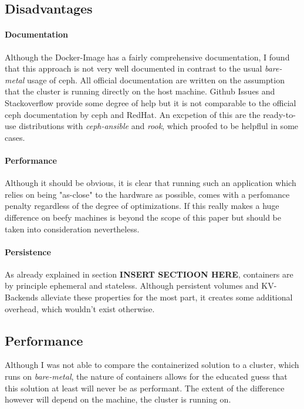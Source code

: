 \documentclass[titlepage, a4paper, 11pt]{scrartcl}
\begin{document}
        \subsection{Disadvantages}

            \paragraph{Documentation} Although the Docker-Image has a fairly comprehensive documentation, I found that this approach is not very well documented in contrast to the usual \textit{bare-metal} usage of ceph. All official documentation are written on the assumption that the cluster is running directly on the host machine. Github Issues and Stackoverflow provide some degree of help but it is not comparable to the official ceph documentation by ceph and RedHat. An excpetion of this are the ready-to-use distributions with \textit{ceph-ansible} and \textit{rook}, which proofed to be helpflul in some cases.

            \paragraph{Performance} Although it should be obvious, it is clear that running such an application which relies on being "as-close" to the hardware as possible, comes with a perfomance penalty regardless of the degree of optimizations. If this really makes a huge difference on beefy machines is beyond the scope of this paper but should be taken into consideration nevertheless. 

            \paragraph{Persistence} As already explained in section \textbf{INSERT SECTIOON HERE}, containers are by principle ephemeral and stateless. Although persistent volumes and KV-Backends alleviate these properties for the most part, it creates some additional overhead, which wouldn't exist otherwise.

        \subsection{Performance}\label{performance:tuning}

            Although I was not able to compare the containerized solution to a cluster, which runs on \textit{bare-metal}, 
            the nature of containers allows for the educated guess that this solution at least will never be as performant. The extent of the difference however will depend on the machine, the cluster is running on. 
\end{document}
